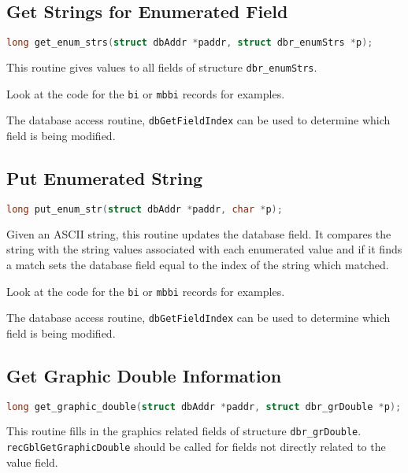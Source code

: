 \subsection{Get Strings for Enumerated Field}

\begin{lstlisting}[language=C]
long get_enum_strs(struct dbAddr *paddr, struct dbr_enumStrs *p);
\end{lstlisting}

This routine gives values to all fields of structure \verb|dbr_enumStrs|.

Look at the code for the \verb|bi| or \verb|mbbi| records for examples.

The database access routine, \verb|dbGetFieldIndex| can be used to determine which field is being modified.

\subsection{Put Enumerated String}

\begin{lstlisting}[language=C]
long put_enum_str(struct dbAddr *paddr, char *p);
\end{lstlisting}

Given an ASCII string, this routine updates the database field.
It compares the string with the string values associated with each enumerated value and if it finds a match sets the database field equal to the index of the string which matched.

Look at the code for the \verb|bi| or \verb|mbbi| records for examples.

The database access routine, \verb|dbGetFieldIndex| can be used to determine which field is being modified.

\subsection{Get Graphic Double Information}

\begin{lstlisting}[language=C]
long get_graphic_double(struct dbAddr *paddr, struct dbr_grDouble *p);
\end{lstlisting}

This routine fills in the graphics related fields of structure \verb|dbr_grDouble|.
\verb|recGblGetGraphicDouble| should be called for fields not directly related to the value field.

